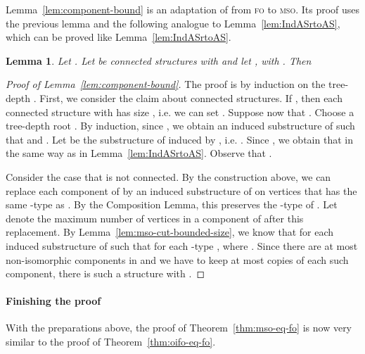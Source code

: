 \documentclass[11pt]{article}
\newtheorem{lemma}[theorem]{Lemma}
\newcommand{\logic}[1]{\textsc{#1}}
\newcommand{\FO}{\logic{fo}}
\newcommand{\MSO}{\logic{mso}}
\begin{document}
Lemma~\ref{lem:component-bound} is an adaptation of
\cite[Thm. 6.7]{NesetrilMendez2012} from \FO{} to \MSO{}.  Its proof uses the
previous lemma and the following analogue to Lemma~\ref{lem:IndASrtoAS}, which
can be proved like Lemma~\ref{lem:IndASrtoAS}.

\begin{lemma}
  \label{lem:mso-IndASrtoAS}
  Let . Let
   be connected structures with 
  and let ,
  with .
  Then 
\end{lemma}
\begin{proof}[Proof of Lemma~\ref{lem:component-bound}]
  The proof is by induction on the tree-depth .  First, we consider the claim
  about connected structures.  If , then each connected structure with
   has size , i.e. we can set .  Suppose
  now that . Choose a tree-depth root .  By induction,
  since , we obtain an induced substructure  of
   such that  and .  Let  be the substructure of  induced by , i.e. . Since , we
  obtain that  in the same way as in
  Lemma~\ref{lem:IndASrtoAS}. Observe that .

  Consider the case that  is not connected. By the construction
  above, we can replace each component  of  by an induced
  substructure of  on  vertices that has the
  same -type as . By the Composition Lemma, this preserves the
  -type of . Let  denote the maximum
  number of vertices in a component of  after this
  replacement. By Lemma~\ref{lem:mso-cut-bounded-size}, we know that
   for each induced substructure  of 
  such that  for each -type
  , where . Since there are at most 
  non-isomorphic components in  and we have to keep at most 
  copies of each such component, there is such a structure  with
  .
\end{proof}

\paragraph{Finishing the proof}

With the preparations above, the proof of Theorem~\ref{thm:mso-eq-fo} is now
very similar to the proof of Theorem~\ref{thm:oifo-eq-fo}. 
\end{document}
